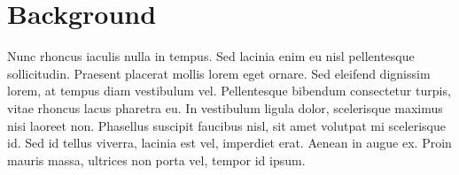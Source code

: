 \section{Background}

Nunc rhoncus iaculis nulla in tempus. Sed lacinia enim eu nisl pellentesque sollicitudin. Praesent placerat mollis lorem eget ornare. Sed eleifend dignissim lorem, at tempus diam vestibulum vel. Pellentesque bibendum consectetur turpis, vitae rhoncus lacus pharetra eu. In vestibulum ligula dolor, scelerisque maximus nisi laoreet non. Phasellus suscipit faucibus nisl, sit amet volutpat mi scelerisque id. Sed id tellus viverra, lacinia est vel, imperdiet erat. Aenean in augue ex. Proin mauris massa, ultrices non porta vel, tempor id ipsum.